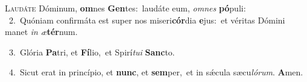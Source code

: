 \lettrine{\initial\textcolor{\initialcolor}{L}}{audáte} Dóminum, \textbf{om}\-nes \textbf{Gen}\-tes:~\star laudáte eum, \textit{om}\-\textit{nes} \textbf{pó}\-puli:\\
{\numbfont\textcolor{\numbcolor}{~2.}}~Quóniam confirmáta est super nos miseri\-\textbf{cór}\-dia \textbf{e}\-jus:~\star et véritas Dómini manet \textit{in} \textit{æ}\-\textbf{tér}num.\par
{\numbfont\textcolor{\numbcolor}{~3.}}~Glória \textbf{Pa}\-tri, et \textbf{Fí}\-lio,~\star et Spirí\-\textit{tu}\-\textit{i} \textbf{Sanc}\-to.\par
{\numbfont\textcolor{\numbcolor}{~4.}}~Sicut erat in princípio, et \textbf{nunc}\-, et \textbf{sem}\-per,~\star et in sǽcula sæcu\-\textit{ló}\-\textit{rum}. \textbf{A}\-men.\par
